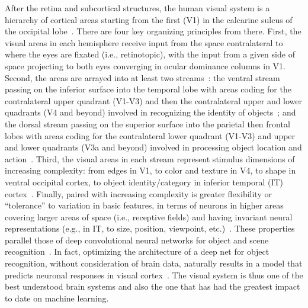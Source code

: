 After the retina and subcortical structures, the
human visual system is a hierarchy of cortical areas
starting from the first (V1) in the calcarine sulcus of
the occipital lobe~\citep{Felleman:1991}. There are four key
organizing principles from there. First, the visual areas in each
hemisphere receive input from the space contralateral to where the
eyes are fixated (i.e., retinotopic), with the input from a given side
of space projecting to both eyes converging in ocular dominance
columns in V1. Second, the areas are arrayed into at least two
streams~\citep{Mishkin:1983,Goodale:1992}: the ventral stream passing
on the inferior surface into the temporal lobe with areas coding for
the contralateral upper quadrant (V1-V3) and then the contralateral
upper and lower quadrants (V4 and beyond) involved in recognizing the identity of
objects~\citep{Arcaro:2009}; and the dorsal stream passing on the superior
surface into the parietal then frontal lobes with areas coding for the
contralateral lower quadrant (V1-V3) and upper and lower quadrants (V3a and beyond)
involved in processing object location and
action~\citep{Konen:2008}. Third, the visual areas in each stream
represent stimulus dimensions of increasing complexity:
from edges in V1, to color and texture in V4, to shape in ventral
occipital cortex, to object identity/category in inferior temporal (IT)
cortex~\citep{Grill-Spector:2003,Rousselet:2004}. Finally, paired with
increasing complexity is greater flexibility or ``tolerance'' to
variation in basic features, in terms of neurons in higher
areas covering larger areas of space (i.e., receptive fields) and having 
invariant neural representations (e.g., in IT, to size, position, viewpoint, etc.)~\citep{Rust:2010}.
These properties parallel those of deep convolutional neural networks
for object and scene recognition~\citep{Kriegeskorte:2015}. In
fact, optimizing the architecture of a deep net for object
recognition, without consideration of brain data, naturally
results in a model that predicts neuronal responses in visual
cortex~\citep{Yamins:2016}. The visual system is thus one of the best
understood brain systems and also the one that has had the
greatest impact to date on machine learning.

